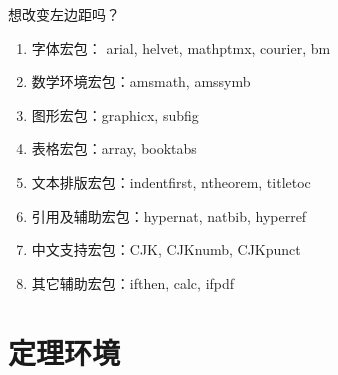 想改变左边距吗？
\begin{enumerate}[\setlength{\itemindent}{5em}]
\item 字体宏包： arial, helvet, mathptmx, courier, bm
\item 数学环境宏包：amsmath, amssymb
\item 图形宏包：graphicx, subfig
\item 表格宏包：array, booktabs
\item 文本排版宏包：indentfirst, ntheorem, titletoc
\item 引用及辅助宏包：hypernat, natbib, hyperref
\item 中文支持宏包：CJK, CJKnumb, CJKpunct
\item 其它辅助宏包：ifthen, calc, ifpdf
\end{enumerate}


\section{定理环境}
\label{sec:theorem}

